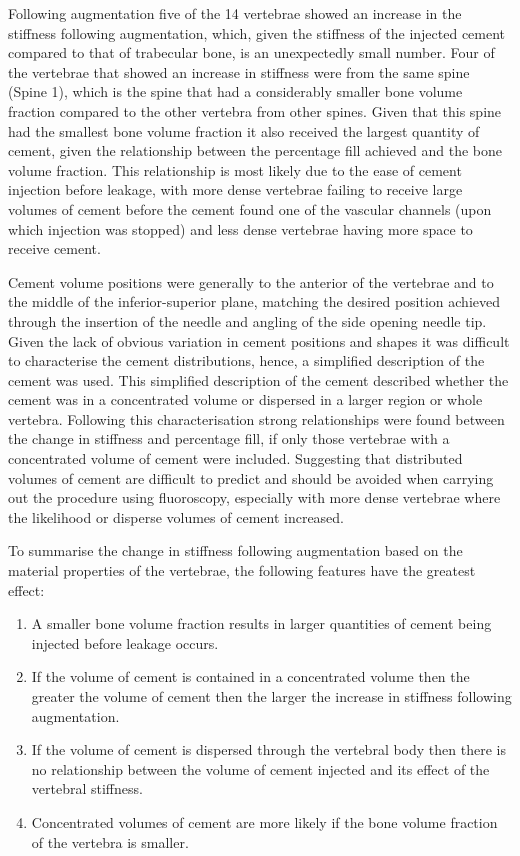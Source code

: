 Following augmentation five of the 14 vertebrae showed an increase in the stiffness following augmentation, which, given the stiffness of the injected cement compared to that of trabecular bone, is an unexpectedly small number.
Four of the vertebrae that showed an increase in stiffness were from the same spine (Spine 1), which is the spine that had a considerably smaller bone volume fraction compared to the other vertebra from other spines.
Given that this spine had the smallest bone volume fraction it also received the largest quantity of cement, given the relationship between the percentage fill achieved and the bone volume fraction.
This relationship is most likely due to the ease of cement injection before leakage, with more dense vertebrae failing to receive large volumes of cement before the cement found one of the vascular channels (upon which injection was stopped) and less dense vertebrae having more space to receive cement.

Cement volume positions were generally to the anterior of the vertebrae and to the middle of the inferior-superior plane, matching the desired position achieved through the insertion of the needle and angling of the side opening needle tip.
Given the lack of obvious variation in cement positions and shapes it was difficult to characterise the cement distributions, hence, a simplified description of the cement was used.
This simplified description of the cement described whether the cement was in a concentrated volume or dispersed in a larger region or whole vertebra.
Following this characterisation strong relationships were found between the change in stiffness and percentage fill, if only those vertebrae with a concentrated volume of cement were included.
Suggesting that distributed volumes of cement are difficult to predict and should be avoided when carrying out the procedure using fluoroscopy, especially with more dense vertebrae where the likelihood or disperse volumes of cement increased.


To summarise the change in stiffness following augmentation based on the material properties of the vertebrae, the following features have the greatest effect:
\begin{enumerate}
    \item A smaller bone volume fraction results in larger quantities of cement being injected before leakage occurs.
    \item If the volume of cement is contained in a concentrated volume then the greater the volume of cement then the larger the increase in stiffness following augmentation.
    \item If the volume of cement is dispersed through the vertebral body then there is no relationship between the volume of cement injected and its effect of the vertebral stiffness.
    \item Concentrated volumes of cement are more likely if the bone volume fraction of the vertebra is smaller.
\end{enumerate}

